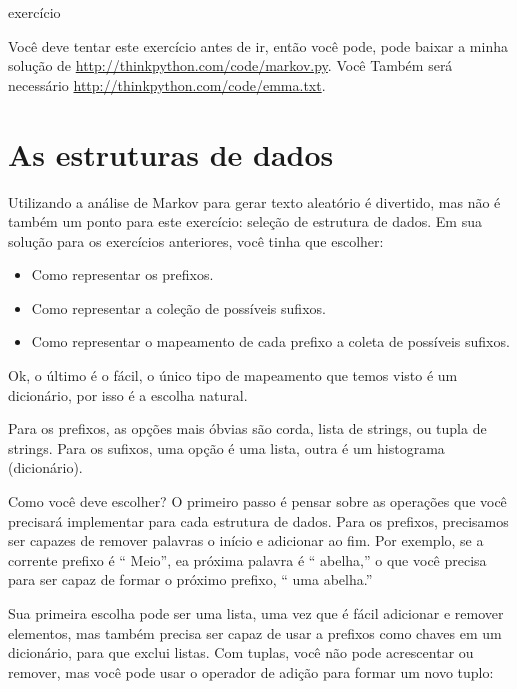 \documentclass[10pt]{book}
\begin{document}
\begin{v erbatim}
\begin{}
\end{} exercício

Você deve tentar este exercício antes de ir, então você pode, pode
baixar a minha solução de \url{http://thinkpython.com/code/markov.py}. Você
Também será necessário \url{http://thinkpython.com/code/emma.txt}.


\section{As estruturas de dados}

Utilizando a análise de Markov para gerar texto aleatório é divertido, mas não é
também um ponto para este exercício: seleção de estrutura de dados. Em sua
solução para os exercícios anteriores, você tinha que escolher:

\begin{itemize}

\item Como representar os prefixos.

\item Como representar a coleção de possíveis sufixos.

\item Como representar o mapeamento de cada prefixo
a coleta de possíveis sufixos.

\end{itemize}

Ok, o último é o fácil, o único tipo de mapeamento que temos
visto é um dicionário, por isso é a escolha natural.

Para os prefixos, as opções mais óbvias são corda,
lista de strings, ou tupla de strings. Para os sufixos,
uma opção é uma lista, outra é um histograma (dicionário).

Como você deve escolher? O primeiro passo é pensar sobre
as operações que você precisará implementar para cada estrutura de dados.
Para os prefixos, precisamos ser capazes de remover palavras
o início e adicionar ao fim. Por exemplo, se a corrente
prefixo é `` Meio'', ea próxima palavra é `` abelha,'' o que você precisa
para ser capaz de formar o próximo prefixo, `` uma abelha.''

Sua primeira escolha pode ser uma lista, uma vez que é fácil adicionar
e remover elementos, mas também precisa ser capaz de usar a
prefixos como chaves em um dicionário, para que exclui listas.
Com tuplas, você não pode acrescentar ou remover, mas você pode usar
o operador de adição para formar um novo tuplo:


\end{v erbatim}
\end{document}
